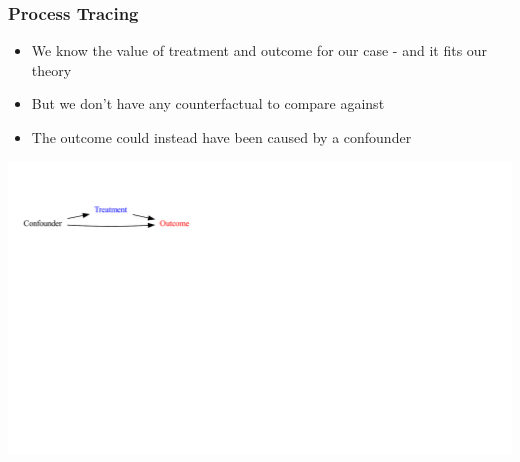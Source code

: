 \documentclass[xcolor=x11names,compress]{beamer}\usepackage[]{graphicx}\usepackage[]{color}
\newenvironment{knitrout}{}{} %
\renewcommand{\(}{\begin{columns}}
\renewcommand{\)}{\end{columns}}
\newcommand{\<}[1]{\begin{column}{#1}}
\renewcommand{\>}{\end{column}}
\begin{document}
\begin{frame}
\frametitle{Process Tracing}
\begin{itemize}
\item We know the value of treatment and outcome for our case - and it fits our theory
\pause
\item But we don't have any counterfactual to compare against
\pause
\item The outcome could instead have been caused by a confounder
\end{itemize}
\begin{knitrout}
\color{fgcolor}
\includegraphics[width=1.8\linewidth]{figure/Dag1-1} 

\end{knitrout}
\end{frame}
\end{document}
